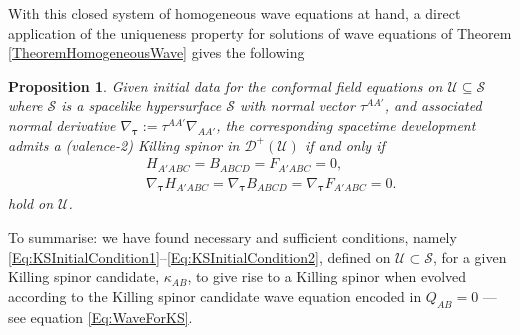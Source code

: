 \documentclass[10pt,a4paper]{article}
\theoremstyle{plain}
\newtheorem{proposition}{Proposition}
\begin{document}
With this closed system of homogeneous wave equations at hand,
a direct application of the uniqueness property for solutions of wave equations
of Theorem \ref{TheoremHomogeneousWave} gives the following
\begin{proposition}\label{Prop:Propagation_KS}
  Given initial data for the conformal field equations on $\mathcal{U}\subseteq\mathcal{S}$
  where $\mathcal{S}$ is a spacelike
hypersurface $\mathcal{S}$ with normal vector $\tau^{AA'}$, and
associated normal derivative $\nabla_{\bm\tau} :=
\tau^{AA'}\nabla_{AA'}$, the corresponding spacetime development
admits a (valence-2) Killing spinor in $\mathcal{D}^{+}(\mathcal{U})$
if and only if
\begin{subequations}
\begin{eqnarray}
  && H_{A'ABC}=B_{ABCD}=F_{A'ABC}=0,\label{Eq:KSInitialCondition1}\\ &&
   \nabla_{\bm\tau} H_{A'ABC}=\nabla_{\bm\tau} B_{ABCD}= \nabla_{\bm\tau} F_{A'ABC}=0 \label{Eq:KSInitialCondition2}.
\end{eqnarray}
\end{subequations}
 hold on $\mathcal{U}$.
\end{proposition}
To summarise: we have found necessary and sufficient conditions,
namely \eqref{Eq:KSInitialCondition1}--\eqref{Eq:KSInitialCondition2},
defined on $\mathcal{U}\subset \mathcal{S}$, for a given Killing
spinor candidate, $\kappa_{AB}$, to give rise to a Killing spinor when
evolved according to the Killing spinor candidate wave equation encoded in $Q_{AB}=0$
---see equation \eqref{Eq:WaveForKS}.
\end{document}
